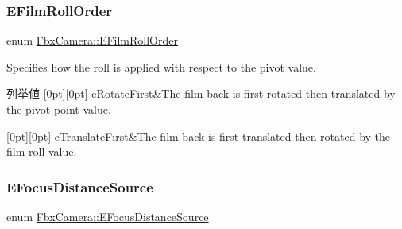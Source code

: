 \subsubsection{\texorpdfstring{E\+Film\+Roll\+Order}{EFilmRollOrder}}
{\footnotesize\ttfamily enum \hyperlink{class_fbx_camera_a831d9b7ffcbf3611715eb2ad9108870b}{Fbx\+Camera\+::\+E\+Film\+Roll\+Order}}

Specifies how the roll is applied with respect to the pivot value. \begin{DoxyEnumFields}{列挙値}
[0pt][0pt]{}\mbox{\label{class_fbx_camera_a831d9b7ffcbf3611715eb2ad9108870bad500528c8c031dde3349136db2fae5d1}} 
e\+Rotate\+First&The film back is first rotated then translated by the pivot point value. \\
\hline

[0pt][0pt]{}\mbox{\label{class_fbx_camera_a831d9b7ffcbf3611715eb2ad9108870ba7e8e7f860d61236b2a6cc8300953b071}} 
e\+Translate\+First&The film back is first translated then rotated by the film roll value. \\
\hline

\end{DoxyEnumFields}
\mbox{\label{class_fbx_camera_a1b50e7b2953019a40328599679071ad4}} 
\subsubsection{\texorpdfstring{E\+Focus\+Distance\+Source}{EFocusDistanceSource}}
{\footnotesize\ttfamily enum \hyperlink{class_fbx_camera_a1b50e7b2953019a40328599679071ad4}{Fbx\+Camera\+::\+E\+Focus\+Distance\+Source}}

